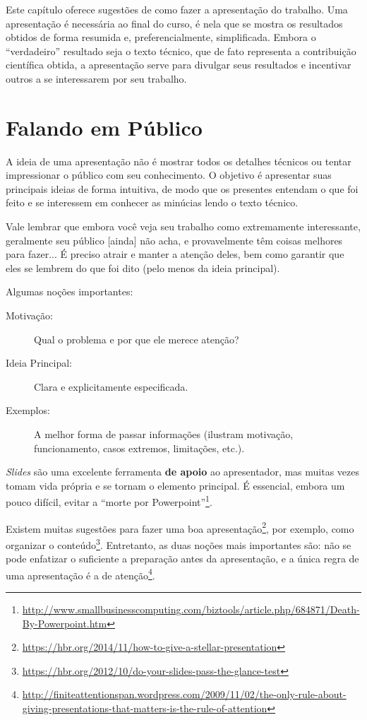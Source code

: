 Este capítulo oferece sugestões de como fazer a apresentação do trabalho. Uma
apresentação é necessária ao final do curso, é nela que se mostra os resultados
obtidos de forma resumida e, preferencialmente, simplificada. Embora o ``verdadeiro''
resultado seja o texto técnico, que de fato representa a contribuição científica
obtida, a apresentação serve para divulgar seus resultados e incentivar outros a
se interessarem por seu trabalho.

\section{Falando em Público}
A ideia de uma apresentação não é mostrar todos os detalhes técnicos ou tentar
impressionar o público com seu conhecimento. O objetivo é apresentar suas principais
ideias de forma intuitiva, de modo que os presentes entendam o que foi feito e
se interessem em conhecer as minúcias lendo o texto técnico.

Vale lembrar que embora você veja seu trabalho como extremamente interessante,
geralmente seu público [ainda] não acha, e provavelmente têm coisas melhores para fazer...
É preciso atrair e manter a atenção deles, bem como garantir que eles se lembrem
do que foi dito (pelo menos da ideia principal).

Algumas noções importantes:
\begin{description}
\item[Motivação:] Qual o problema e por que ele merece atenção?
\item[Ideia Principal:] Clara e explicitamente especificada.
\item[Exemplos:] A melhor forma de passar informações (ilustram motivação,
funcionamento, casos extremos, limitações, etc.).
\end{description}

\emph{Slides} são uma excelente ferramenta \textbf{de apoio} ao apresentador, mas
muitas vezes tomam vida própria e se tornam o elemento principal. É essencial,
embora um pouco difícil,  evitar a ``morte por Powerpoint''\footnote{%
\url{http://www.smallbusinesscomputing.com/biztools/article.php/684871/Death-By-Powerpoint.htm}}.

Existem muitas sugestões para fazer uma boa apresentação\footnote{\url{https://hbr.org/2014/11/how-to-give-a-stellar-presentation}},
por exemplo, como organizar o conteúdo\footnote{\url{https://hbr.org/2012/10/do-your-slides-pass-the-glance-test}}.
Entretanto, as duas noções mais importantes são: não se pode enfatizar o suficiente
a preparação antes da apresentação, e a única regra de uma apresentação é a
de atenção\footnote{\url{http://finiteattentionspan.wordpress.com/2009/11/02/the-only-rule-about-giving-presentations-that-matters-is-the-rule-of-attention}}.

